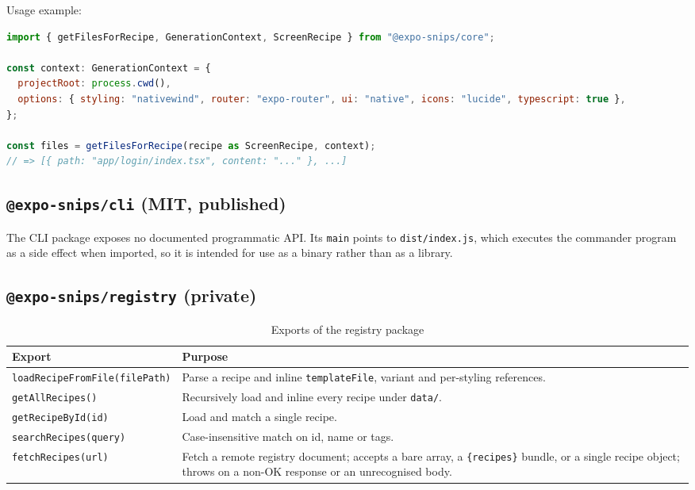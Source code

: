 Usage example:

\begin{lstlisting}[language=JavaScript]
import { getFilesForRecipe, GenerationContext, ScreenRecipe } from "@expo-snips/core";

const context: GenerationContext = {
  projectRoot: process.cwd(),
  options: { styling: "nativewind", router: "expo-router", ui: "native", icons: "lucide", typescript: true },
};

const files = getFilesForRecipe(recipe as ScreenRecipe, context);
// => [{ path: "app/login/index.tsx", content: "..." }, ...]
\end{lstlisting}

\subsection*{\texttt{@expo-snips/cli} (MIT, published)}

The CLI package exposes no documented programmatic API. Its
\texttt{main} points to \texttt{dist/index.js}, which executes the commander
program as a side effect when imported, so it is intended for use as a binary
rather than as a library.

\subsection*{\texttt{@expo-snips/registry} (private)}

\begin{longtable}{p{6.4cm}p{7.8cm}}
\caption{Exports of the registry package}\\
\toprule
\textbf{Export} & \textbf{Purpose} \\
\midrule

\texttt{loadRecipeFromFile(filePath)} & Parse a recipe and inline \texttt{templateFile},
variant and per-styling references. \\
\texttt{getAllRecipes()} & Recursively load and inline every recipe under
\texttt{data/}. \\
\texttt{getRecipeById(id)} & Load and match a single recipe. \\
\texttt{searchRecipes(query)} & Case-insensitive match on id, name or tags. \\
\texttt{fetchRecipes(url)} & Fetch a remote registry document; accepts a bare array,
a \texttt{\{recipes\}} bundle, or a single recipe object; throws on a non-OK
response or an unrecognised body. \\
\bottomrule
\end{longtable}

